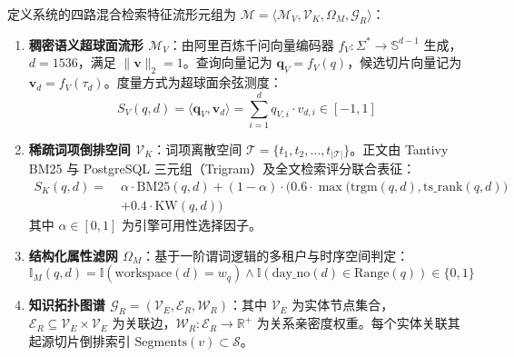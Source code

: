 \begin{definition}[统一混合表示空间]
    定义系统的四路混合检索特征流形元组为 $\mathcal{M} = \langle \mathcal{M}_V, \mathcal{V}_K, \Omega_M, \mathcal{G}_R \rangle$：
    \begin{enumerate}
        \item \textbf{稠密语义超球面流形 $\mathcal{M}_V$}：由阿里百炼千问向量编码器 $f_V: \Sigma^* \rightarrow \mathbb{S}^{d-1}$ 生成，$d=1536$，满足 $\|\mathbf{v}\|_2 = 1$。查询向量记为 $\mathbf{q}_V = f_V(q)$，候选切片向量记为 $\mathbf{v}_d = f_V(\tau_d)$。度量方式为超球面余弦测度：
              \begin{equation}
                  S_V(q, d) = \langle \mathbf{q}_V, \mathbf{v}_d \rangle = \sum_{i=1}^{d} q_{V,i} \cdot v_{d,i} \in [-1, 1]
              \end{equation}

        \item \textbf{稀疏词项倒排空间 $\mathcal{V}_K$}：词项离散空间 $\mathcal{T} = \{t_1, t_2, \ldots, t_{|\mathcal{T}|}\}$。正文由 Tantivy BM25 与 PostgreSQL 三元组（Trigram）及全文检索评分联合表征：
              \begin{equation}
              \begin{split}
                  S_K(q, d) = \; & \alpha \cdot \text{BM25}(q, d) + (1-\alpha) \cdot \Big( 0.6 \cdot \max\big(\text{trgm}(q, d), \text{ts\_rank}(q, d)\big) \\
                  & + 0.4 \cdot \text{KW}(q, d) \Big)
              \end{split}
              \end{equation}
              其中 $\alpha \in [0, 1]$ 为引擎可用性选择因子。

        \item \textbf{结构化属性滤网 $\Omega_M$}：基于一阶谓词逻辑的多租户与时序空间判定：
              \begin{equation}
                  \mathbb{I}_M(q, d) = \mathbb{I}(\text{workspace}(d) = w_q) \land \mathbb{I}(\text{day\_no}(d) \in \text{Range}(q)) \in \{0, 1\}
              \end{equation}

        \item \textbf{知识拓扑图谱 $\mathcal{G}_R = (\mathcal{V}_E, \mathcal{E}_R, \mathcal{W}_R)$}：其中 $\mathcal{V}_E$ 为实体节点集合，$\mathcal{E}_R \subseteq \mathcal{V}_E \times \mathcal{V}_E$ 为关联边，$\mathcal{W}_R: \mathcal{E}_R \rightarrow \mathbb{R}^+$ 为关系亲密度权重。每个实体关联其起源切片倒排索引 $\text{Segments}(v) \subset \mathcal{S}$。
    \end{enumerate}
\end{definition}

